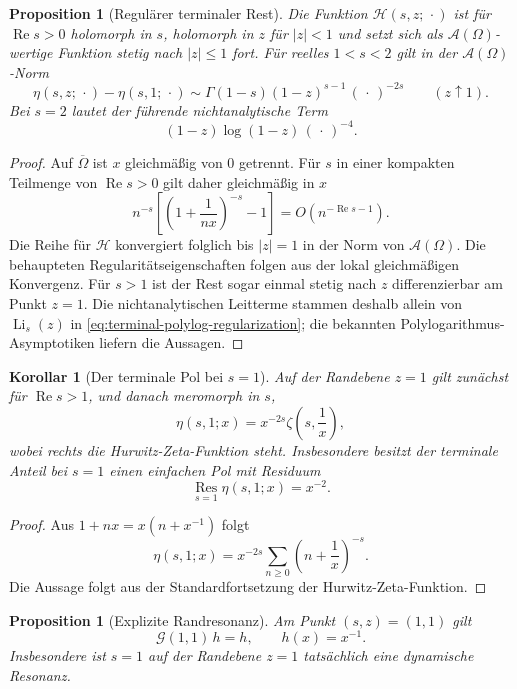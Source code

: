\documentclass[11pt,a4paper]{article}
\newtheorem{proposition}[remark]{Proposition}
\newtheorem{corollary}[remark]{Korollar}
\begin{document}
\begin{proposition}[Regulärer terminaler Rest]
Die Funktion $\mathcal H(s,z;\,\cdot)$ ist für
$\operatorname{Re}s>0$ holomorph in $s$, holomorph in $z$ für
$|z|<1$ und setzt sich als $\mathcal A(\Omega)$-wertige Funktion
stetig nach $|z|\le1$ fort. Für reelles $1<s<2$ gilt in der
$\mathcal A(\Omega)$-Norm
\[
 \eta(s,z;\,\cdot)-\eta(s,1;\,\cdot)
 \sim
 \Gamma(1-s)(1-z)^{s-1}\,(\,\cdot\,)^{-2s}
 \qquad(z\uparrow1).
\]
Bei $s=2$ lautet der führende nichtanalytische Term
\[
 (1-z)\log(1-z)\,(\,\cdot\,)^{-4}.
\]
\end{proposition}

\begin{proof}
Auf $\overline\Omega$ ist $x$ gleichmäßig von $0$ getrennt. Für $s$
in einer kompakten Teilmenge von $\operatorname{Re}s>0$ gilt daher
gleichmäßig in $x$
\[
 n^{-s}
 \left[
 \left(1+\frac1{nx}\right)^{-s}-1
 \right]
 =
 O\!\left(n^{-\operatorname{Re}s-1}\right).
\]
Die Reihe für $\mathcal H$ konvergiert folglich bis $|z|=1$ in der
Norm von $\mathcal A(\Omega)$. Die behaupteten Regularitätseigenschaften
folgen aus der lokal gleichmäßigen Konvergenz. Für $s>1$ ist der Rest
sogar einmal stetig nach $z$ differenzierbar am Punkt $z=1$. Die
nichtanalytischen Leitterme stammen deshalb allein von
$\operatorname{Li}_s(z)$ in \eqref{eq:terminal-polylog-regularization};
die bekannten Polylogarithmus-Asymptotiken liefern die Aussagen.
\end{proof}

\begin{corollary}[Der terminale Pol bei $s=1$]
Auf der Randebene $z=1$ gilt zunächst für $\operatorname{Re}s>1$,
und danach meromorph in $s$,
\[
 \eta(s,1;x)
 =
 x^{-2s}\zeta\!\left(s,\frac1x\right),
\]
wobei rechts die Hurwitz-Zeta-Funktion steht. Insbesondere besitzt
der terminale Anteil bei $s=1$ einen einfachen Pol mit Residuum
\[
 \operatorname*{Res}_{s=1}\eta(s,1;x)=x^{-2}.
\]
\end{corollary}

\begin{proof}
Aus $1+nx=x(n+x^{-1})$ folgt
\[
 \eta(s,1;x)
 =
 x^{-2s}\sum_{n\ge0}\left(n+\frac1x\right)^{-s}.
\]
Die Aussage folgt aus der Standardfortsetzung der Hurwitz-Zeta-Funktion.
\end{proof}

\begin{proposition}[Explizite Randresonanz]
Am Punkt $(s,z)=(1,1)$ gilt
\[
 \mathcal G(1,1)\,h=h,
 \qquad h(x)=x^{-1}.
\]
Insbesondere ist $s=1$ auf der Randebene $z=1$ tatsächlich eine
dynamische Resonanz.
\end{proposition}
\end{document}
